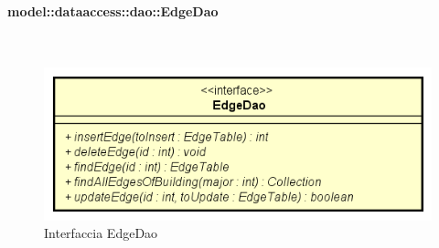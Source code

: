 \documentclass[../DefinizioneDiProdotto.tex]{subfiles}
\begin{document}
\paragraph{model::dataaccess::dao::EdgeDao}
\
\begin{figure}[H]
	\centering
	\includegraphics[width=\maxwidth]{img/EdgeDao.png}
	\caption{Interfaccia EdgeDao}\label{fig:model::dataaccess::dao::EdgeDao} 
\end{figure}
\end{document}
